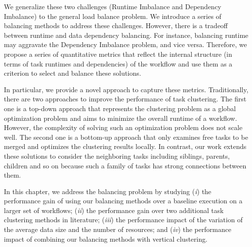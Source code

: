 We generalize these two challenges (Runtime Imbalance and Dependency Imbalance) to the general load balance problem. We introduce a series of balancing methods to address these challenges. However, there is a tradeoff between runtime and data dependency balancing. For instance, balancing runtime may aggravate the Dependency Imbalance problem, and vice versa. Therefore, we propose a series of quantitative metrics that reflect the internal structure (in terms of task runtimes and dependencies) of the workflow and use them as a criterion to select and balance these solutions.


In particular, we provide a novel approach to capture these metrics. Traditionally, there are two approaches to improve the performance of task clustering. The first one is a top-down approach \cite{Integration2012} that represents the clustering problem as a global optimization problem and aims to minimize the overall runtime of a workflow. However, the complexity of solving such an optimization problem does not scale well. The second one is a bottom-up approach \cite{Muthuvelu2005}\cite{Liu2009} that only examines free tasks to be merged and optimizes the clustering results locally. In contrast, our work extends these solutions to consider the neighboring tasks including siblings, parents, children and so on because such a family of tasks has strong connections between them. 

In this chapter, we address the balancing problem by studying (\emph{i}) the performance gain of using our balancing methods over a baseline execution on a larger set of workflows; (\emph{ii}) the performance gain over two additional task clustering methods in literature; (\emph{iii}) the performance impact of the variation of the average data size and the number of resources; and (\emph{iv}) the performance impact of combining our balancing methods with vertical clustering.




